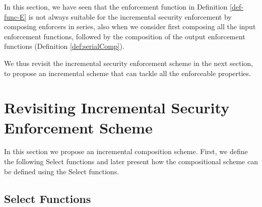 
In this section, we have seen that the enforcement function in Definition \ref{def-func-E}  is not always suitable for the incremental security enforcement by composing enforcers in series, also when we consider first composing all the input enforcement functions, followed by the composition of the output enforcement functions (Definition \ref{def:serialComp}).



We thus revisit the incremental security enforcement scheme in the next section, to propose an incremental scheme that can tackle all the enforceable properties.


\section{Revisiting Incremental Security Enforcement  Scheme}
\label{sec:new:def}
In this section we propose an incremental composition scheme. First, we define the following Select functions and later present how the compositional scheme can be defined using the Select functions. 

%
\subsection{Select Functions}
\label{sec:new:edit}

%

